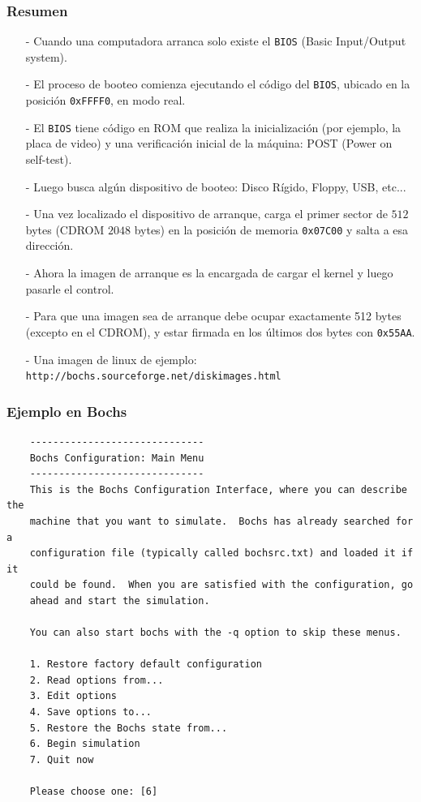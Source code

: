 \documentclass[aspectratio=169]{beamer}
\begin{document}
\begin{frame}[fragile]
\frametitle{Resumen}
    \begin{itemize}
    \item[-] Cuando una computadora arranca solo existe el \texttt{BIOS} (Basic Input/Output system).
    \item[-] El proceso de booteo comienza ejecutando el código del \texttt{BIOS}, ubicado en la posición \texttt{0xFFFF0}, en modo real.
    \item[-] El \texttt{BIOS} tiene código en ROM que realiza la inicialización (por ejemplo, la placa de video) y una verificación inicial de la máquina: POST (Power on self-test).
    \item[-] Luego busca algún dispositivo de booteo: Disco Rígido, Floppy, USB, etc...
    \item[-] Una vez localizado el dispositivo de arranque, carga el primer sector de $512$ bytes (CDROM $2048$ bytes) en la posición de memoria \texttt{0x07C00} y salta a esa dirección.
    \item[-] Ahora la imagen de arranque es la encargada de cargar el kernel y luego pasarle el control.
    \item[-] Para que una imagen sea de arranque debe ocupar exactamente 512 bytes (excepto en el CDROM), y estar firmada en los últimos dos bytes con \texttt{0x55AA}.
    \item[-] Una imagen de linux de ejemplo: \texttt{http://bochs.sourceforge.net/diskimages.html}
    \end{itemize}
\end{frame}

\begin{frame}[fragile]
    \frametitle{Ejemplo en Bochs}
    \scriptsize
    \begin{verbatim}
    ------------------------------
    Bochs Configuration: Main Menu
    ------------------------------
    This is the Bochs Configuration Interface, where you can describe the
    machine that you want to simulate.  Bochs has already searched for a
    configuration file (typically called bochsrc.txt) and loaded it if it
    could be found.  When you are satisfied with the configuration, go
    ahead and start the simulation.

    You can also start bochs with the -q option to skip these menus.

    1. Restore factory default configuration
    2. Read options from...
    3. Edit options
    4. Save options to...
    5. Restore the Bochs state from...
    6. Begin simulation
    7. Quit now

    Please choose one: [6]
    \end{verbatim}
\end{frame}
\end{document}
